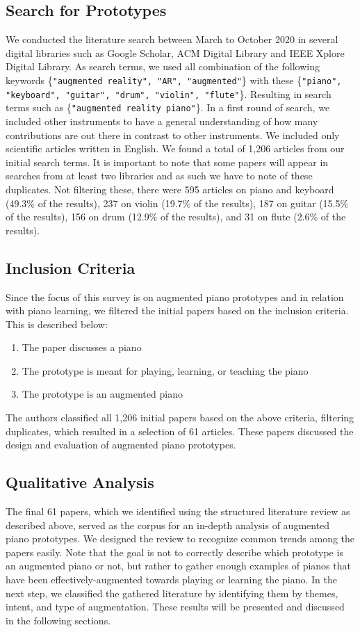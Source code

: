 \documentclass[sigconf, screen, review]{acmart}
\begin{document}
\subsection{Search for Prototypes}
We conducted the literature search between March to October 2020 in several digital libraries such as Google Scholar, ACM Digital Library and IEEE Xplore Digital Library. As search terms, we used all combination of the following keywords \{\texttt{"augmented reality", "AR", "augmented"}\} with these \{\texttt{"piano", "keyboard", "guitar", "drum", "violin", "flute"}\}. Resulting in search terms such as \{\texttt{"augmented reality piano"}\}. In a first round of search, we included other instruments to have a general understanding of how many contributions are out there in contrast to other instruments. We included only scientific articles written in English. We found a total of 1,206 articles from our initial search terms. It is important to note that some papers will appear in searches from at least two libraries and as such we have to note of these duplicates. Not filtering these, there were 595 articles on piano and keyboard (49.3\% of the results), 237 on violin (19.7\% of the results), 187 on guitar (15.5\% of the results), 156 on drum (12.9\% of the results), and 31 on flute (2.6\% of the results). 

\subsection{Inclusion Criteria}
Since the focus of this survey is on augmented piano prototypes and in relation with piano learning, we filtered the initial papers based on the inclusion criteria. This is described below: 
\begin{enumerate}
    \item The paper discusses a piano
    \item The prototype is meant for playing, learning, or teaching the piano
    \item The prototype is an augmented piano 
\end{enumerate}
The authors classified all 1,206 initial papers based on the above criteria, filtering duplicates, which resulted in a selection of 61 articles. These papers discussed the design and evaluation of augmented piano prototypes. 

\subsection{Qualitative Analysis}
The final 61 papers, which we identified using the structured literature review as described above, served as the corpus for an in-depth analysis of augmented piano prototypes. We designed the review to recognize common trends among the papers easily. Note that the goal is not to correctly describe which prototype is an augmented piano or not, but rather to gather enough examples of pianos that have been effectively-augmented towards playing or learning the piano. In the next step, we classified the gathered literature by identifying them by themes, intent, and type of augmentation. These results will be presented and discussed in the following sections. 
\end{document}
